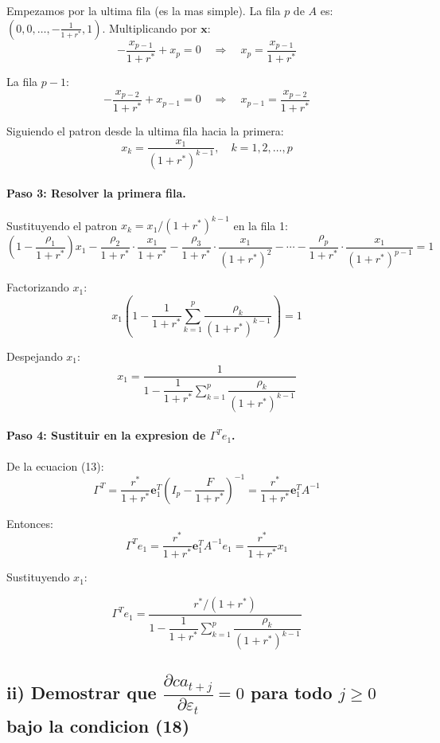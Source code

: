 Empezamos por la ultima fila (es la mas simple). La fila $p$ de $A$ es:
$(0, 0, \ldots, -\tfrac{1}{1+r^*}, 1)$. Multiplicando por $\mathbf{x}$:
\[
    -\frac{x_{p-1}}{1+r^*} + x_p = 0
    \quad\Longrightarrow\quad
    x_p = \frac{x_{p-1}}{1+r^*}
\]

La fila $p-1$:
\[
    -\frac{x_{p-2}}{1+r^*} + x_{p-1} = 0
    \quad\Longrightarrow\quad
    x_{p-1} = \frac{x_{p-2}}{1+r^*}
\]

Siguiendo el patron desde la ultima fila hacia la primera:
\[
    x_k = \frac{x_1}{(1+r^*)^{k-1}}, \quad k = 1, 2, \ldots, p
\]

\paragraph{Paso 3: Resolver la primera fila.}

Sustituyendo el patron $x_k = x_1/(1+r^*)^{k-1}$ en la fila 1:
\[
    \left(1 - \frac{\rho_1}{1+r^*}\right)x_1
    - \frac{\rho_2}{1+r^*} \cdot \frac{x_1}{1+r^*}
    - \frac{\rho_3}{1+r^*} \cdot \frac{x_1}{(1+r^*)^2}
    - \cdots
    - \frac{\rho_p}{1+r^*} \cdot \frac{x_1}{(1+r^*)^{p-1}} = 1
\]

Factorizando $x_1$:
\[
    x_1 \left(1 - \frac{1}{1+r^*} \sum_{k=1}^{p} \frac{\rho_k}{(1+r^*)^{k-1}}\right) = 1
\]

Despejando $x_1$:
\[
    x_1 = \frac{1}{1 - \dfrac{1}{1+r^*} \displaystyle\sum_{k=1}^{p} \dfrac{\rho_k}{(1+r^*)^{k-1}}}
\]

\paragraph{Paso 4: Sustituir en la expresion de $\Gamma^T e_1$.}

De la ecuacion (13):
\[
    \Gamma^T = \frac{r^*}{1+r^*} \mathbf{e}_1^T \left(I_p - \frac{F}{1+r^*}\right)^{-1}
    = \frac{r^*}{1+r^*} \mathbf{e}_1^T A^{-1}
\]

Entonces:
\[
    \Gamma^T e_1 = \frac{r^*}{1+r^*} \mathbf{e}_1^T A^{-1} e_1 = \frac{r^*}{1+r^*} x_1
\]

Sustituyendo $x_1$:

\begin{resultado}
\[
    \Gamma^T e_1 = \frac{r^*/(1+r^*)}{1 - \dfrac{1}{1+r^*} \displaystyle\sum_{k=1}^{p} \dfrac{\rho_k}{(1+r^*)^{k-1}}}
\]
\end{resultado}

\subsection*{ii) Demostrar que $\dfrac{\partial ca_{t+j}}{\partial \varepsilon_t} = 0$ para todo $j \geq 0$ bajo la condicion (18)}

